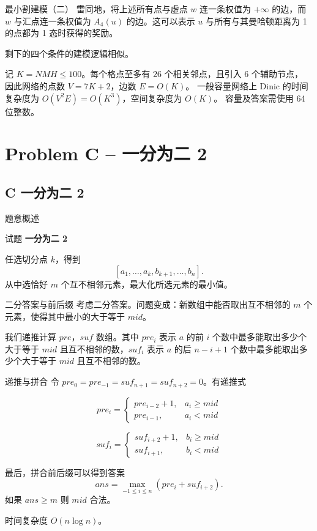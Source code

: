 \documentclass{beamer}
\newcommand{\TT}[1]{{\ttfamily #1}}
\newcommand{\BF}[1]{\textbf{#1}}
\begin{document}
{\begin{frame}{最小割建模（二）}
雷同地，将上述所有点与虚点 $w$ 连一条权值为 $+\infty$ 的边，而 $w$ 与汇点连一条权值为 $A_4(u)$ 的边。这可以表示 $u$ 与所有与其曼哈顿距离为 1 的点都为 1 态时获得的奖励。
\vspace{0.5em}

剩下的四个条件的建模逻辑相似。
\vspace{0.5em}

记 $K=NMH\le100$。每个格点至多有 $26$ 个相关邻点，且引入 $6$ 个辅助节点，
因此网络的点数 $V=7K+2$，边数 $E=O(K)$。
一般容量网络上 Dinic 的时间复杂度为 $O(V^2E)=O(K^3)$，空间复杂度为 $O(K)$。
容量及答案需使用 64 位整数。
\end{frame}}

{
\section[C]{Problem C -- 一分为二 2}
\subsection{C 一分为二 2}
\begin{frame}{题意概述}
  \begin{center}试题 \myboxiii{\BF{\TT{C}}} \BF{一分为二 2}\end{center}
  任选切分点 $k$，得到
  \[
    [a_1,\ldots,a_k,b_{k+1},\ldots,b_n].
  \]
  从中选恰好 $m$ 个互不相邻元素，最大化所选元素的最小值。
\end{frame}


\begin{frame}{二分答案与前后缀}
  考虑二分答案。问题变成：新数组中能否取出互不相邻的 $m$ 个元素，使得其中最小的大于等于 $mid$。

  \vspace{0.5em}
  我们递推计算 $pre$，$suf$ 数组。其中 $pre_i$ 表示 $a$ 的前 $i$ 个数中最多能取出多少个大于等于 $mid$ 且互不相邻的数，$suf_i$ 表示 $a$ 的后 $n-i+1$ 个数中最多能取出多少个大于等于 $mid$ 且互不相邻的数。
\end{frame}

\begin{frame}{递推与拼合}
  令 $pre_0=pre_{-1}=suf_{n+1}=suf_{n+2}=0$。有递推式

  \[pre_i= \begin{cases}pre_{i-2}+1 ,& a_i \ge mid \\pre_{i-1},& a_i<mid \end{cases}\]

  \[suf_i= \begin{cases}suf_{i+2}+1 ,& b_i \ge mid \\suf_{i+1},& b_i<mid \end{cases}\]

  \vspace{0.5em}
  最后，拼合前后缀可以得到答案
  \[
    ans=\max_{-1\le i\le n}\left(pre_i+suf_{i+2}\right).
  \]
  如果 $ans\ge m$ 则 $mid$ 合法。

  \vspace{0.5em}
  时间复杂度 $O(n\log n)$。
\end{frame}}
\end{document}
